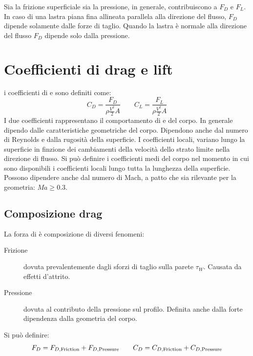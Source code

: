 Sia la frizione superficiale sia la pressione, in generale, contribuiscono a $F_D$ e $F_L$. In caso di una lastra piana fina allineata parallela alla direzione del flusso, $F_D$ dipende solamente dalle forze di taglio.
Quando la lastra è normale alla direzione del flusso $F_D$ dipende solo dalla pressione.

\section{Coefficienti di drag e lift}
i coefficienti di  e  sono definiti come:
\begin{equation}
C_D = \frac{F_D}{\rho \frac{V^2}{2}A} \qquad C_L = \frac{F_L}{\rho \frac{V^2}{2}A}
\end{equation}
I due coefficienti rappresentano il comportamento di  e  del corpo.
In generale dipendo dalle caratteristiche geometriche del corpo. Dipendono anche dal numero di Reynolds e dalla rugosità della superficie.
I coefficienti locali, variano lungo la superficie in finzione dei cambiamenti della velocità dello strato limite nella direzione di flusso.
Si può definire i coefficienti medi del corpo nel momento in cui sono disponibili i coefficienti locali lungo tutta la lunghezza della superficie. 
Possono dipendere anche dal numero di Mach, a patto che sia rilevante per la geometria: $Ma \geq 0.3$.

\subsection{Composizione drag}
La forza di  è composizione di diversi fenomeni:
\begin{description}
\item[Frizione] dovuta prevalentemente dagli sforzi di taglio sulla parete $\tau_W$. Causata da effetti d'attrito.
\item[Pressione] dovuta al contributo della pressione sul profilo. Definita anche dalla forte dipendenza dalla geometria del corpo.
\end{description}
Si può definire:
\begin{equation}
F_D = F_{D, \textup{Friction}} + F_{D, \textup{Pressure}} \qquad C_D = C_{D, \textup{Friction}} + C_{D, \textup{Pressure}}
\end{equation}

